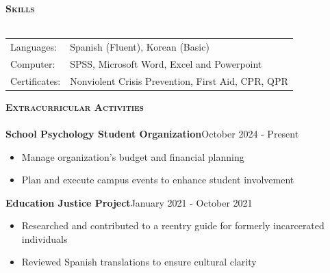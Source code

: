 \documentclass[a4paper]{article}
\newcommand{\lineunder} {
    \vspace*{-8pt} \\
    \hspace*{-18pt} \hrulefill \\
}
\newcommand{\header} [1] {
    {\hspace*{-18pt}\vspace*{6pt} \textsc{#1}}
    \vspace*{-6pt} \lineunder
}
\begin{document}
\header{\textbf{Skills}}
\begin{tabular}{ l l }
    Languages: & Spanish (Fluent), Korean (Basic) \\
    Computer: & SPSS, Microsoft Word, Excel and Powerpoint \\
    Certificates: & Nonviolent Crisis Prevention, First Aid, CPR, QPR
\end{tabular}


\vspace{1mm}


\header{\textbf{Extracurricular Activities}}

\textbf{School Psychology Student Organization}\hfill October 2024 - Present\\
\begin{itemize}[nolistsep]
    \item Manage organization’s budget and financial planning
    \item Plan and execute campus events to enhance student involvement    
\end{itemize} 

\vspace{1mm}

\textbf{Education Justice Project}\hfill January 2021 - October 2021\\
\begin{itemize}[nolistsep]
    \item Researched and contributed to a reentry guide for formerly incarcerated individuals
    \item Reviewed Spanish translations to ensure cultural clarity
\end{itemize} 
\end{document}
